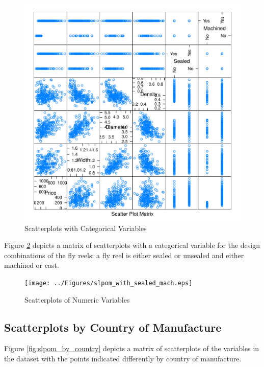 \documentclass[11pt]{book}
\begin{document}
\begin{figure}[h!]
  \centering
  \includegraphics[scale = 0.5, keepaspectratio=true]{../Figures/slpom_with_cat}
  \caption{Scatterplots with Categorical Variables} \label{fig:slpom_with_cat}
\end{figure}


\pagebreak


Figure \ref{fig:slpom_with_sealed_mach.eps} depicts a matrix of scatterplots
with a categorical variable for the design combinations of the fly reels:
a fly reel is either sealed or unsealed and either machined or cast.

\begin{figure}[h!]
  \centering
  \texttt{[image: ../Figures/slpom\_with\_sealed\_mach.eps]}
  \caption{Scatterplots of Numeric Variables} \label{fig:slpom_with_sealed_mach.eps}
\end{figure}



\pagebreak
\subsection*{Scatterplots by Country of Manufacture}

Figure \ref{fig:slpom_by_country} depicts a matrix of scatterplots
of the variables in the dataset
with the points indicated differently by country of manufacture.
\end{document}
